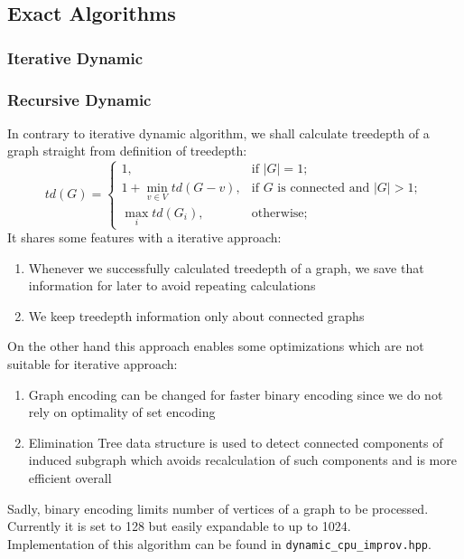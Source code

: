 \subsection{Exact Algorithms}
\subsubsection{Iterative Dynamic}
\subsubsection{Recursive Dynamic}
In contrary to iterative dynamic algorithm, we shall calculate treedepth of a graph straight from definition of treedepth:
\begin{equation}
td(G)={\begin{cases}1,&{\text{if }}|G|=1;\\1+\min _{{v\in V}}td(G-v),&{\text{if }}G{\text{ is connected and }}|G|>1;\\\max _{{i}}td(G_{i}),&{\text{otherwise}};\end{cases}}
\end{equation}
It shares some features with a iterative approach:
\begin{enumerate}
	\item Whenever we successfully calculated treedepth of a graph, we save that information for later to avoid repeating calculations
	\item We keep treedepth information only about connected graphs
\end{enumerate}
On the other hand this approach enables some optimizations which are not suitable for iterative approach:
\begin{enumerate}
	\item Graph encoding can be changed for faster binary encoding since we do not rely on optimality of set encoding
	\item Elimination Tree data structure is used to detect connected components of induced subgraph which avoids recalculation of such components and is more efficient overall
\end{enumerate}
Sadly, binary encoding limits number of vertices of a graph to be processed. Currently it is set to 128 but easily expandable to up to 1024.\\
Implementation of this algorithm can be found in \texttt{dynamic\_cpu\_improv.hpp}.

